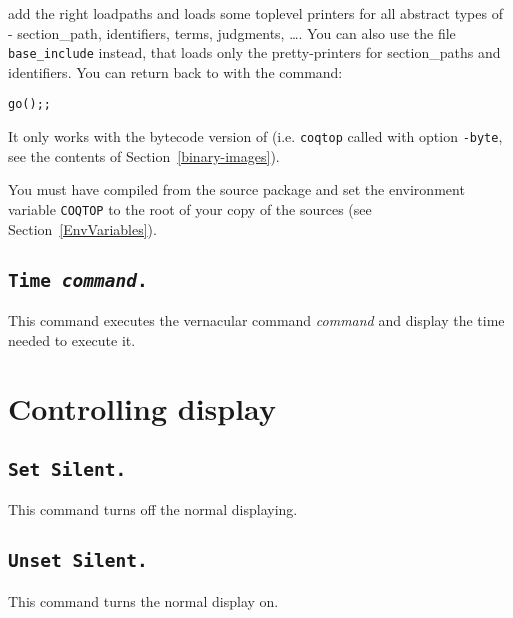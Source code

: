 \noindent add the right loadpaths and loads some toplevel printers for
all abstract types of \Coq - section\_path, identifiers, terms, judgments,
\dots. You can also use the file \texttt{base\_include} instead,
that loads only the pretty-printers for section\_paths and
identifiers.
You can return back to \Coq{} with the command: 

\begin{flushleft}
\begin{verbatim}
go();;
\end{verbatim}
\end{flushleft}

\begin{Warnings}
\item It only works with the bytecode version of {\Coq} (i.e. {\tt coqtop} called with option {\tt -byte}, see the contents of Section~\ref{binary-images}).
\item You must have compiled {\Coq} from the source package and set the
  environment variable \texttt{COQTOP} to the root of your copy of the sources (see Section~\ref{EnvVariables}).
\end{Warnings}

\subsection[\tt Time \textrm{\textsl{command}}.]{\tt Time \textrm{\textsl{command}}.
\label{time}}
This command executes the vernacular command \textrm{\textsl{command}}
and display the time needed to execute it.

\section{Controlling display}

\subsection[\tt Set Silent.]{\tt Set Silent.
\label{Begin-Silent}
}
This command turns off the normal displaying.

\subsection[\tt Unset Silent.]{\tt Unset Silent.}
This command turns the normal display on.

